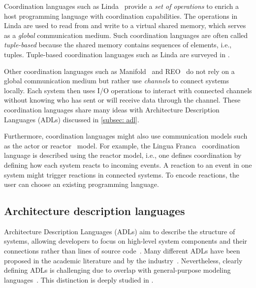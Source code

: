 \documentclass[runningheads]{llncs}
\begin{document}
Coordination languages such as Linda~\cite{carrieroLindaContext1989} provide a \textit{set of operations} to enrich a host programming language with coordination capabilities.
The operations in Linda are used to read from and write to a virtual shared memory, which serves as a \textit{global} communication medium.
Such coordination languages are often called \textit{tuple-based} because the shared memory contains sequences of elements, i.e., tuples.
Tuple-based coordination languages such as Linda are surveyed in \cite{rossiTuplebasedTechnologiesCoordination2001,nixonTuplespacebasedComputingSemantic2008,omiciniCoordinationModelsLanguages2011}.

Other coordination languages such as Manifold~\cite{arbabOverviewManifoldIts1993,papadopoulosModellingActivitiesInformation1998} and REO~\cite{arbabReoChannelbasedCoordination2004} do not rely on a global communication medium but rather use \textit{channels} to connect systems locally.
Each system then uses I/O operations to interact with connected channels without knowing who has sent or will receive data through the channel.
These coordination languages share many ideas with Architecture Description Languages (ADLs) discussed in \autoref{subsec: adl}.

Furthermore, coordination languages might also use communication models such as the actor or reactor~\cite{lohstrohReactorsDeterministicModel2020} model.
For example, the Lingua Franca~\cite{lohstrohReactorsDeterministicModel2020,lohstrohLinguaFrancaDeterministic2021} coordination language is described using the reactor model, i.e., one defines coordination by defining how each system reacts to incoming events.
A reaction to an event in one system might trigger reactions in connected systems.
To encode reactions, the user can choose an existing programming language.

\subsection{Architecture description languages} \label{subsec: adl}
Architecture Description Languages (ADLs) aim to describe the structure of systems, allowing developers to focus on high-level system components and their connections rather than lines of source code~\cite{clementsSurveyArchitectureDescription1996,medvidovicClassificationComparisonFramework2000,medvidovicFrameworkClassifyingComparing1997}.
Many different ADLs have been proposed in the academic literature and by the industry~\cite{medvidovicClassificationComparisonFramework2000,woodsArchitectureDescriptionLanguages2005}.
Nevertheless, clearly defining ADLs is challenging due to overlap with general-purpose modeling languages~\cite{clementsSurveyArchitectureDescription1996}.
This distinction is deeply studied in \cite{medvidovicClassificationComparisonFramework2000}.
\end{document}

